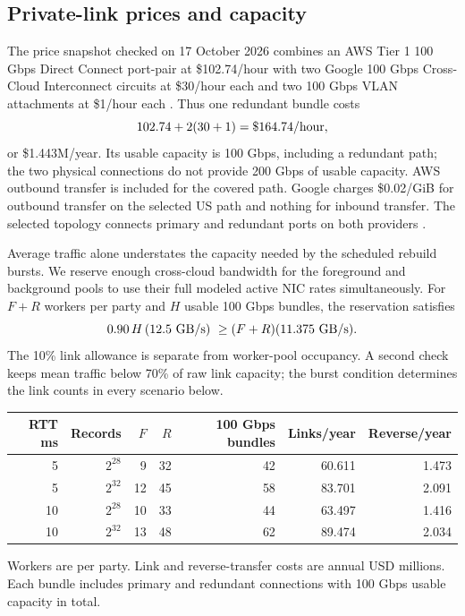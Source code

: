 \documentclass[11pt]{article}
\begin{document}
\subsection{Private-link prices and capacity}
The price snapshot checked on 17 October 2026 combines an AWS Tier 1
100 Gbps Direct Connect port-pair at \$102.74/hour with two Google
100 Gbps Cross-Cloud Interconnect circuits at \$30/hour each and two
100 Gbps VLAN attachments at \$1/hour each
\cite{aws-flat-rate,gcp-interconnect}. Thus one redundant bundle costs
\[
 102.74+2(30+1)=\$164.74/{\rm hour},
\]
or \$1.443M/year. Its usable capacity is 100 Gbps, including a redundant
path; the two physical connections do not provide 200 Gbps of usable
capacity. AWS outbound transfer is included for the covered path. Google
charges \$0.02/GiB for outbound transfer on the selected US path and
nothing for inbound transfer. The selected topology connects primary
and redundant ports on both providers \cite{gcp-cci-topology}.

Average traffic alone understates the capacity needed by the scheduled
rebuild bursts. We reserve enough cross-cloud bandwidth for the foreground
and background pools to use their full modeled active NIC rates
simultaneously. For $F+R$ workers per party and $H$ usable 100 Gbps bundles,
the reservation satisfies
\[
 0.90\,H\,(12.5\ {\rm GB/s})\ \geq
 (F+R)(11.375\ {\rm GB/s}).
\]
The 10\% link allowance is separate from worker-pool occupancy. A second
check keeps mean traffic below 70\% of raw link capacity; the burst
condition determines the link counts in every scenario below.

\begin{center}\footnotesize
\begin{tabular}{rrrrrrr}\toprule
RTT ms & Records & $F$ & $R$ & 100 Gbps bundles & Links/year & Reverse/year\\\midrule
5 & $2^{28}$ & 9 & 32 & 42 & 60.611 & 1.473\\
5 & $2^{32}$ & 12 & 45 & 58 & 83.701 & 2.091\\
10 & $2^{28}$ & 10 & 33 & 44 & 63.497 & 1.416\\
10 & $2^{32}$ & 13 & 48 & 62 & 89.474 & 2.034\\
\bottomrule\end{tabular}\end{center}
{\footnotesize Workers are per party. Link and reverse-transfer costs are annual USD millions. Each bundle includes primary and redundant connections with 100 Gbps usable capacity in total.\par}
\end{document}
